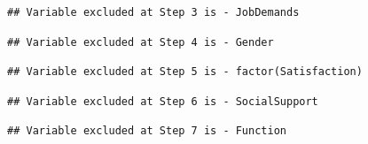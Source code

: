 \documentclass[
]{book}
\newenvironment{Shaded}{\begin{snugshade}}{\end{snugshade}}
\newcommand{\NormalTok}[1]{#1}
\newcommand{\OperatorTok}[1]{\textcolor[rgb]{0.81,0.36,0.00}{\textbf{#1}}}
\begin{document}
\begin{verbatim}
## Variable excluded at Step 3 is - JobDemands
\end{verbatim}

\begin{verbatim}
## Variable excluded at Step 4 is - Gender
\end{verbatim}

\begin{verbatim}
## Variable excluded at Step 5 is - factor(Satisfaction)
\end{verbatim}

\begin{verbatim}
## Variable excluded at Step 6 is - SocialSupport
\end{verbatim}

\begin{verbatim}
## Variable excluded at Step 7 is - Function
\end{verbatim}

\begin{Shaded}
\end{Shaded}
\end{document}
